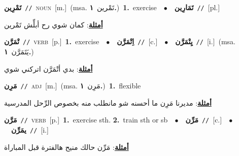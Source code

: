 \documentclass[10pt,a4paper,twoside]{article} %
\begin{document}
\begin{multicols}{2}
{\setlength\topsep{0pt}\textbf{\foreignlanguage{arabic}{تَمْرِين}}\ {\color{gray}\texttt{//}\color{black}}\ \textsc{noun}\ [m.]\ \color{gray}(msa. \foreignlanguage{arabic}{تَمْرين}~\foreignlanguage{arabic}{\textbf{١.}})\color{black}\ \textbf{1.}~exercise\ \ $\bullet$\ \ \setlength\topsep{0pt}\textbf{\foreignlanguage{arabic}{تَمَارِين}}\ {\color{gray}\texttt{//}\color{black}}\ [pl.]\  \begin{flushright}\color{gray}\foreignlanguage{arabic}{\textbf{\underline{\foreignlanguage{arabic}{أمثلة}}}: كمان شوي رح أبلِّش تَمْرين}\end{flushright}\color{black}} \vspace{2mm}

{\setlength\topsep{0pt}\textbf{\foreignlanguage{arabic}{تْمَرَّن}}\ {\color{gray}\texttt{//}\color{black}}\ \textsc{verb}\ [p.]\ \textbf{1.}~exercise\ \ $\bullet$\ \ \setlength\topsep{0pt}\textbf{\foreignlanguage{arabic}{اِتْمَرَّن}}\ {\color{gray}\texttt{//}\color{black}}\ [c.]\ \ $\bullet$\ \ \setlength\topsep{0pt}\textbf{\foreignlanguage{arabic}{يِتْمَرَّن}}\ {\color{gray}\texttt{//}\color{black}}\ [i.]\ \color{gray}(msa. \foreignlanguage{arabic}{يَتَمَرَّن}~\foreignlanguage{arabic}{\textbf{١.}})\color{black}\  \begin{flushright}\color{gray}\foreignlanguage{arabic}{\textbf{\underline{\foreignlanguage{arabic}{أمثلة}}}: بدي أتْمَرَّن اتركني شوي}\end{flushright}\color{black}} \vspace{2mm}

{\setlength\topsep{0pt}\textbf{\foreignlanguage{arabic}{مَرِن}}\ {\color{gray}\texttt{//}\color{black}}\ \textsc{adj}\ [m.]\ \color{gray}(msa. \foreignlanguage{arabic}{مَرِن}~\foreignlanguage{arabic}{\textbf{١.}})\color{black}\ \textbf{1.}~flexible\  \begin{flushright}\color{gray}\foreignlanguage{arabic}{\textbf{\underline{\foreignlanguage{arabic}{أمثلة}}}: مديرنا مَرِن ما أحسنه شو مانطلب منه بخصوص الرِّحل المدرسية}\end{flushright}\color{black}} \vspace{2mm}

{\setlength\topsep{0pt}\textbf{\foreignlanguage{arabic}{مَرَّن}}\ {\color{gray}\texttt{//}\color{black}}\ \textsc{verb}\ [p.]\ \textbf{1.}~exercise sth.  \textbf{2.}~train sth or sb\ \ $\bullet$\ \ \setlength\topsep{0pt}\textbf{\foreignlanguage{arabic}{مَرِّن}}\ {\color{gray}\texttt{//}\color{black}}\ [c.]\ \ $\bullet$\ \ \setlength\topsep{0pt}\textbf{\foreignlanguage{arabic}{يمَرِّن}}\ {\color{gray}\texttt{//}\color{black}}\ [i.]\  \begin{flushright}\color{gray}\foreignlanguage{arabic}{\textbf{\underline{\foreignlanguage{arabic}{أمثلة}}}: مَرِّن حالك منيح هالفترة قبل المباراة}\end{flushright}\color{black}} \vspace{2mm}


\end{multicols}
\end{document}
